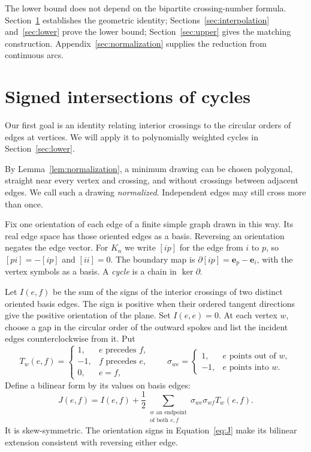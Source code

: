 \documentclass[11pt,a4paper]{article}
\theoremstyle{remark}
\numberwithin{equation}{section}
\newcommand{\ee}{\mathbf e}
\begin{document}
The lower bound does not depend on the bipartite crossing-number
formula. Section~\ref{sec:cycles} establishes
the geometric identity; Sections~\ref{sec:interpolation}
and~\ref{sec:lower} prove the lower bound; Section~\ref{sec:upper}
gives the matching construction. Appendix~\ref{sec:normalization}
supplies the reduction from continuous arcs.

\section{Signed intersections of cycles}\label{sec:cycles}

Our first goal is an identity relating interior crossings to the circular
orders of edges at vertices. We will apply it to polynomially weighted
cycles in Section~\ref{sec:lower}.

By Lemma~\ref{lem:normalization}, a minimum drawing can be chosen
polygonal, straight near every vertex and crossing, and without
crossings between adjacent edges. We call such a drawing \emph{normalized}.
Independent edges may still cross more than once.

Fix one orientation of each edge of a finite simple graph drawn in this way.
Its real edge space has those oriented edges as a basis. Reversing an
orientation negates the edge vector. For \(K_n\) we write \([ip]\) for
the edge from \(i\) to \(p\), so \([pi]=-[ip]\) and \([ii]=0\).
The boundary map is
\(\partial[ip]=\ee_p-\ee_i\), with the vertex symbols as a basis.
A \emph{cycle} is a chain in \(\ker\partial\).

Let \(I(e,f)\) be the sum of the signs of the interior crossings of
two distinct oriented basis edges. The sign is positive when their
ordered tangent directions give the positive orientation of the plane.
Set \(I(e,e)=0\). At each vertex \(w\), choose a gap in the circular
order of the outward spokes and list the incident edges
counterclockwise from it. Put
\[
T_w(e,f)=
\begin{cases}
1,&e\text{ precedes }f,\\
-1,&f\text{ precedes }e,\\
0,&e=f,
\end{cases}
\qquad
\sigma_{we}=
\begin{cases}
1,&e\text{ points out of }w,\\
-1,&e\text{ points into }w.
\end{cases}
\]
Define a bilinear form by its values on basis edges:
\begin{equation}\label{eq:J}
J(e,f)=I(e,f)+\frac12
\sum_{\substack{w\text{ an endpoint}\\\text{of both }e,f}}
\sigma_{we}\sigma_{wf}T_w(e,f).
\end{equation}
It is skew-symmetric. The orientation signs in
Equation~\eqref{eq:J} make its bilinear extension consistent with
reversing either edge.
\end{document}
